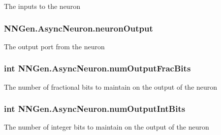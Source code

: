 The inputs to the neuron 

\hypertarget{class_n_n_gen_1_1_async_neuron_a5b2ce64b48dcdfeddd29ea02a933f119}{}
\subsubsection[{neuron\+Output}]{ N\+N\+Gen.\+Async\+Neuron.\+neuron\+Output\hspace{0.3cm}{\ttfamily [get]}}\label{class_n_n_gen_1_1_async_neuron_a5b2ce64b48dcdfeddd29ea02a933f119}


The output port from the neuron 

\hypertarget{class_n_n_gen_1_1_async_neuron_a3b0880328253a0c90da2d8ed655941bd}{}
\subsubsection[{num\+Output\+Frac\+Bits}]{\setlength{\rightskip}{0pt plus 5cm}int N\+N\+Gen.\+Async\+Neuron.\+num\+Output\+Frac\+Bits\hspace{0.3cm}{\ttfamily [get]}}\label{class_n_n_gen_1_1_async_neuron_a3b0880328253a0c90da2d8ed655941bd}


The number of fractional bits to maintain on the output of the neuron 

\hypertarget{class_n_n_gen_1_1_async_neuron_a0a5f5459d5bfe73ec3c6e1fd584ea126}{}
\subsubsection[{num\+Output\+Int\+Bits}]{\setlength{\rightskip}{0pt plus 5cm}int N\+N\+Gen.\+Async\+Neuron.\+num\+Output\+Int\+Bits\hspace{0.3cm}{\ttfamily [get]}}\label{class_n_n_gen_1_1_async_neuron_a0a5f5459d5bfe73ec3c6e1fd584ea126}


The number of integer bits to maintain on the output of the neuron 

